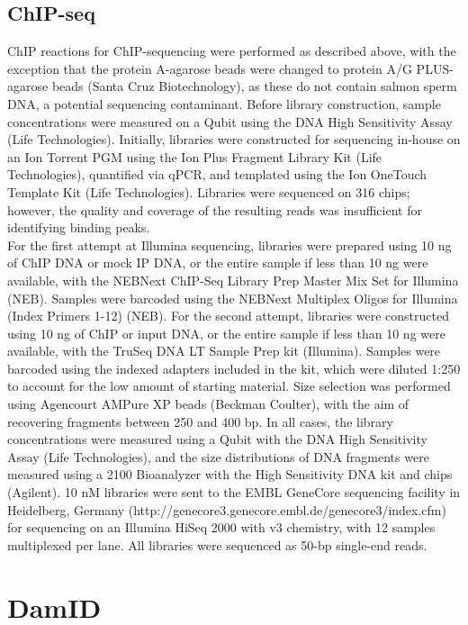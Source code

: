 \subsection{ChIP-seq}
ChIP reactions for ChIP-sequencing were performed as described above, with the exception that the protein A-agarose beads were changed to protein A/G PLUS-agarose beads (Santa Cruz Biotechnology), as these do not contain salmon sperm DNA, a potential sequencing contaminant. Before library construction, sample concentrations were measured on a Qubit using the DNA High Sensitivity Assay (Life Technologies). Initially, libraries were constructed for sequencing in-house on an Ion Torrent PGM using the Ion Plus Fragment Library Kit (Life Technologies), quantified via qPCR, and templated using the Ion OneTouch Template Kit (Life Technologies). Libraries were sequenced on 316 chips; however, the quality and coverage of the resulting reads was insufficient for identifying binding peaks.\\

For the first attempt at Illumina sequencing, libraries were prepared using 10 ng of ChIP DNA or mock IP DNA, or the entire sample if less than 10 ng were available, with the NEBNext ChIP-Seq Library Prep Master Mix Set for Illumina (NEB). Samples were barcoded using the NEBNext Multiplex Oligos for Illumina (Index Primers 1-12) (NEB). For the second attempt, libraries were constructed using 10 ng of ChIP or input DNA, or the entire sample if less than 10 ng were available, with the TruSeq DNA LT Sample Prep kit (Illumina). Samples were barcoded using the indexed adapters included in the kit, which were diluted 1:250 to account for the low amount of starting material. Size selection was performed using Agencourt AMPure XP beads (Beckman Coulter), with the aim of recovering fragments between 250 and 400 bp. In all cases, the library concentrations were measured using a Qubit with the DNA High Sensitivity Assay (Life Technologies), and the size distributions of DNA fragments were measured using a 2100 Bioanalyzer with the High Sensitivity DNA kit and chips (Agilent). 10 nM libraries were sent to the EMBL GeneCore sequencing facility in Heidelberg, Germany (http://genecore3.genecore.embl.de/genecore3/index.cfm) for sequencing on an Illumina HiSeq 2000 with v3 chemistry, with 12 samples multiplexed per lane. All libraries were sequenced as 50-bp single-end reads.

\section{DamID}
